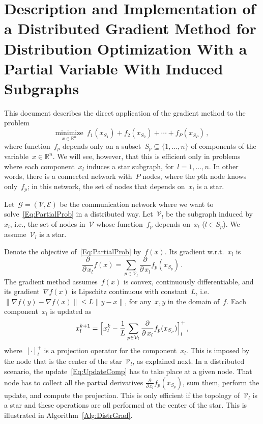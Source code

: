 \documentclass[letter,10pt]{article}
\theoremstyle{definition}
\theoremstyle{nonumberplain}
\newcommand{\mypar}[1]{\bigskip\noindent {\bf #1.}}
\begin{document}
\section*{Description and Implementation of a Distributed Gradient Method for Distribution Optimization With a
	Partial Variable With Induced Subgraphs
}

	This document describes the direct application of the gradient method to the problem
	\begin{equation}\label{Eq:PartialProb}
		\underset{x \in \mathbb{R}^n}{\text{minimize}} \,\,\, f_1(x_{S_1}) + f_2(x_{S_2}) + \cdots + f_P(x_{S_P})\,,
	\end{equation}
	where function~$f_p$ depends only on a subset~$S_p \subseteq \{1,\ldots,n\}$ of components of the variable~$x \in \mathbb{R}^n$. We will see, however, that this is efficient only in problems where each component~$x_l$ induces a star subgraph, for~$l=1,\ldots,n$. In other words, there is a connected network with~$P$ nodes, where the $p$th node knows only~$f_p$; in this network, the set of nodes that depends on~$x_l$ is a star.

\mypar{Derivation}
	Let~$\mathcal{G} = (\mathcal{V},\mathcal{E})$ be the communication network where we want to solve~\eqref{Eq:PartialProb} in a distributed way. Let~$\mathcal{V}_l$ be the subgraph induced by~$x_l$, i.e., the set of nodes in~$\mathcal{V}$ whose function~$f_p$ depends on~$x_l$ ($l \in S_p$). We assume~$\mathcal{V}_l$ is a star.

	Denote the objective of~\eqref{Eq:PartialProb} by~$f(x)$. Its gradient w.r.t.\ $x_l$ is
	$$
		\frac{\partial}{\partial\, x_l}f(x)
		=
		\sum_{p \in \mathcal{V}_l}\frac{\partial}{\partial\, x_l} f_p(x_{S_p})\,.
	$$
	The gradient method assumes~$f(x)$ is convex, continuously differentiable, and its gradient~$\nabla f(x)$ is Lipschitz continuous with constant~$L$, i.e. $\|\nabla f(y) - \nabla f(x)\| \leq L\|y - x\|$, for any~$x,y$ in the domain of~$f$. Each component~$x_l$ is updated as
	\begin{equation}\label{Eq:UpdateComp}
		x_l^{k+1} = \Bigl[ x_l^k - \frac{1}{L} \sum_{p \in \mathcal{V}_l}\frac{\partial}{\partial\, x_l} f_p(x_{S_p}) \Bigr]^+_l\,,
	\end{equation}
	where~$[\cdot]^+_l$ is a projection operator for the component~$x_l$. This is imposed by the node that is the center of the star~$\mathcal{V}_l$, as explained next. In a distributed scenario, the update~\eqref{Eq:UpdateComp} has to take place at a given node. That node has to collect all the partial derivatives $\frac{\partial}{\partial\, x_l} f_p(x_{S_p})$, sum them, perform the update, and compute the projection. This is only efficient if the topology of~$\mathcal{V}_l$ is a star and these operations are all performed at the center of the star. This is illustrated in Algorithm~\ref{Alg:DistrGrad}.
\end{document}

